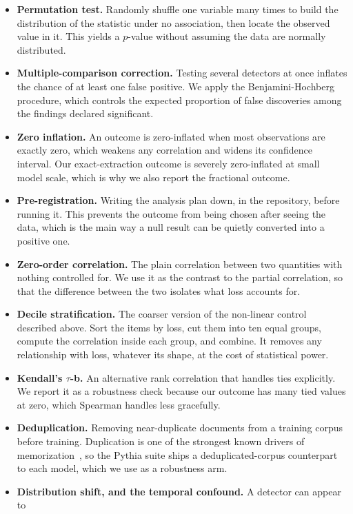 \begin{itemize}
 \item \textbf{Permutation test.} Randomly shuffle one variable many times to build the
 distribution of the statistic under no association, then locate the observed value in
 it. This yields a $p$-value without assuming the data are normally distributed.
 \item \textbf{Multiple-comparison correction.} Testing several detectors at once
 inflates the chance of at least one false positive. We apply the Benjamini-Hochberg
 procedure, which controls the expected proportion of false discoveries among the
 findings declared significant.
 \item \textbf{Zero inflation.} An outcome is zero-inflated when most observations are
 exactly zero, which weakens any correlation and widens its confidence interval. Our
 exact-extraction outcome is severely zero-inflated at small model scale, which is why we
 also report the fractional outcome.
 \item \textbf{Pre-registration.} Writing the analysis plan down, in the repository,
 before running it. This prevents the outcome from being chosen after seeing the data,
 which is the main way a null result can be quietly converted into a positive one.
 \item \textbf{Zero-order correlation.} The plain correlation between two quantities with
 nothing controlled for. We use it as the contrast to the partial correlation, so that the
 difference between the two isolates what loss accounts for.
 \item \textbf{Decile stratification.} The coarser version of the non-linear control
 described above. Sort the items by loss, cut them into ten equal groups, compute the
 correlation inside each group, and combine. It removes any relationship with loss,
 whatever its shape, at the cost of statistical power.
 \item \textbf{Kendall's $\tau$-b.} An alternative rank correlation that handles ties
 explicitly. We report it as a robustness check because our outcome has many tied values
 at zero, which Spearman handles less gracefully.
 \item \textbf{Deduplication.} Removing near-duplicate documents from a training corpus
 before training. Duplication is one of the strongest known drivers of
 memorization~\citep{carlini2023quantifying}, so the Pythia suite ships a
 deduplicated-corpus counterpart to each model, which we use as a robustness arm.
 \item \textbf{Distribution shift, and the temporal confound.} A detector can appear to

\end{itemize}
